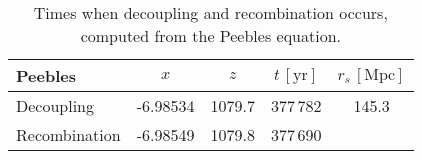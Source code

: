 \begin{table}[ht]
\centering
\caption{Times when decoupling and recombination occurs, computed from the Peebles equation.}
\label{tab:M2:results:rec_and_dec_time_table_Peebles}
\begin{tabular}{l|cccc}
\toprule
      Peebles &      $x$ &    $z$ & $t\,\mathrm{[yr]}$ & $r_s \,\mathrm{[Mpc]}$ \\
\midrule
   Decoupling & -6.98534 & 1079.7 &           377\,782 &                  145.3 \\
Recombination & -6.98549 & 1079.8 &           377\,690 &                        \\
\bottomrule
\end{tabular}
\end{table}
